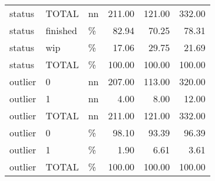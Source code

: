 \begin{longtable}[t]{lllrrr}
status & TOTAL & nn & 211.00 & 121.00 & 332.00\\
status & finished & \% & 82.94 & 70.25 & 78.31\\
status & wip & \% & 17.06 & 29.75 & 21.69\\
status & TOTAL & \% & 100.00 & 100.00 & 100.00\\
outlier & 0 & nn & 207.00 & 113.00 & 320.00\\
outlier & 1 & nn & 4.00 & 8.00 & 12.00\\
outlier & TOTAL & nn & 211.00 & 121.00 & 332.00\\
outlier & 0 & \% & 98.10 & 93.39 & 96.39\\
outlier & 1 & \% & 1.90 & 6.61 & 3.61\\
outlier & TOTAL & \% & 100.00 & 100.00 & 100.00\\*
\end{longtable}
\endgroup{}
